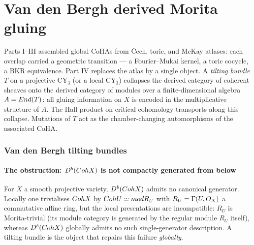 \part{Van den Bergh derived Morita gluing}
\label{part:gluing-vdb}

Parts I--III assembled global CoHAs from \v{C}ech, toric, and McKay atlases: each
overlap carried a geometric transition --- a Fourier--Mukai kernel, a toric
cocycle, a BKR equivalence. Part IV replaces the atlas by a single object. A
\emph{tilting bundle} $T$ on a projective CY$_3$ (or a local CY$_3$)
collapses the derived category of coherent sheaves onto the derived category of
modules over a finite-dimensional algebra $A = End(T)$: all gluing
information on $X$ is encoded in the multiplicative structure of $A$. The Hall
product on critical cohomology transports along this collapse. Mutations of $T$
act as the chamber-changing automorphisms of the associated CoHA.

\section{Van den Bergh tilting bundles}
\label{sec:vdb-tilting}

\subsection*{The obstruction: $D^b(Coh X)$ is not compactly generated from below}

For $X$ a smooth projective variety, $D^b(Coh X)$ admits no canonical
generator. Locally one trivialises $Coh X$ by $Coh U \simeq mod R_U$ with
$R_U = \Gamma(U,O_X)$ a commutative affine ring, but the local presentations
are incompatible: $R_U$ is Morita-trivial (its module category is generated by
the regular module $R_U$ itself), whereas $D^b(Coh X)$ globally admits no such
single-generator description. A tilting bundle is the object that repairs this
failure \emph{globally}.

